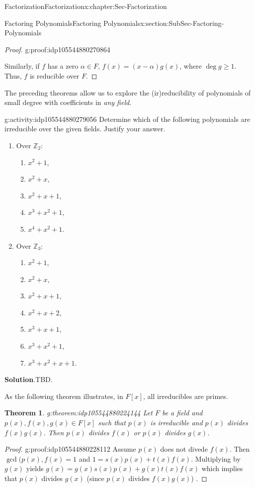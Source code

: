\documentclass[oneside,10pt,]{book}
\newcommand{\blocktitlefont}{\relax}
\numberwithin{equation}{section}
\renewcommand{\ge}{\geqslant}
\def\Z{{\mathbb Z}}
\newtheorem{theorem}{Theorem}[section]
\begin{document}
\begin{chapterptx}{Factorization}{}{Factorization}{}{}{x:chapter:Sec-Factorization}
\begin{sectionptx}{Factoring Polynomials}{}{Factoring Polynomials}{}{}{x:section:SubSec-Factoring-Polynomials}
\begin{proof}{}{g:proof:idp105544880270864}
\par
Similarly, if \(f\) has a zero \(\alpha\in F\), \(f(x) = (x-\alpha)g(x)\), where \(\deg g \ge 1\). Thus, \(f\) is reducible over \(F\).%
\end{proof}
The preceding theorems allow us to explore the (ir)reducibility of polynomials of small degree with coefficients in \emph{any field}.%
\begin{activity}{}{g:activity:idp105544880279056}%
Determine which of the following polynomials are irreducible over the given fields. Justify your answer.%
%
\begin{enumerate}
\item{}Over \(\Z_2\):%
%
\begin{enumerate}
\item{}\(x^2 + 1\),%
\item{}\(x^2 + x\),%
\item{}\(x^2 +x +1\),%
\item{}\(x^3 + x^2 + 1\),%
\item{}\(x^4 + x^2 + 1\).%
\end{enumerate}
\item{}Over \(\Z_3\):%
%
\begin{enumerate}
\item{}\(x^2 + 1\),%
\item{}\(x^2 + x\),%
\item{}\(x^2 +x +1\),%
\item{}\(x^2 +x +2\),%
\item{}\(x^3 + x +1\),%
\item{}\(x^3 + x^2 + 1\),%
\item{}\(x^3 + x^2 + x + 1\).%
\end{enumerate}
\end{enumerate}
\par\smallskip%
\noindent\textbf{\blocktitlefont Solution}.\hypertarget{g:solution:idp105544880223120}{}\quad{}TBD.%
\end{activity}%
As the following theorem illustrates, in \(F[x]\), all irreducibles are primes.%
\begin{theorem}{}{}{g:theorem:idp105544880224144}%
Let \(F\) be a field and \(p(x),f(x),g(x)\in F[x]\) such that \(p(x)\) is irreducible and \(p(x)\) divides \(f(x) g(x)\). Then \(p(x)\) divides \(f(x)\) or \(p(x)\) divides \(g(x)\).%
\end{theorem}
\begin{proof}{}{g:proof:idp105544880228112}
Assume \(p(x)\) does not divede \(f(x)\). Then \(\gcd(p(x),f(x)=1\) and \(1=s(x)p(x)+t(x)f(x)\). Multiplying by \(g(x)\) yields \(g(x)=g(x)s(x)p(x)+g(x)t(x)f(x)\) which implies that \(p(x)\) divides \(g(x)\) (since \(p(x)\) divides \(f(x)g(x)\)) .%

\end{proof}
\end{sectionptx}
\end{chapterptx}
\end{document}
